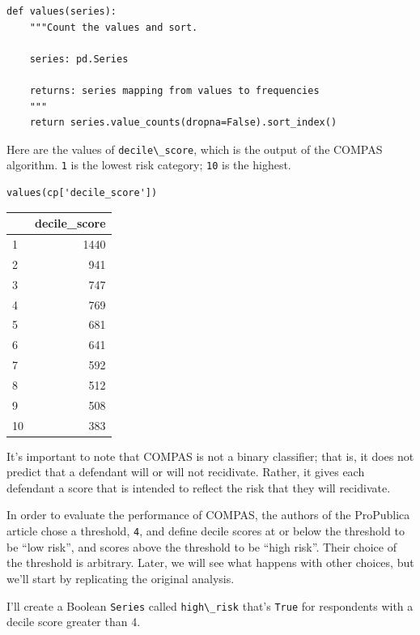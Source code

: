 \begin{lstlisting}[]
def values(series):
    """Count the values and sort.
    
    series: pd.Series
    
    returns: series mapping from values to frequencies
    """
    return series.value_counts(dropna=False).sort_index()
\end{lstlisting}

Here are the values of \passthrough{\lstinline!decile\_score!}, which is
the output of the COMPAS algorithm. \passthrough{\lstinline!1!} is the
lowest risk category; \passthrough{\lstinline!10!} is the highest.

\begin{lstlisting}[]
values(cp['decile_score'])
\end{lstlisting}

\begin{tabular}{lr}
\midrule
{} &  decile\_score \\
\midrule
1  &          1440 \\
2  &           941 \\
3  &           747 \\
4  &           769 \\
5  &           681 \\
6  &           641 \\
7  &           592 \\
8  &           512 \\
9  &           508 \\
10 &           383 \\
\midrule
\end{tabular}

It's important to note that COMPAS is not a binary classifier; that is,
it does not predict that a defendant will or will not recidivate.
Rather, it gives each defendant a score that is intended to reflect the
risk that they will recidivate.

In order to evaluate the performance of COMPAS, the authors of the
ProPublica article chose a threshold, \passthrough{\lstinline!4!}, and
define decile scores at or below the threshold to be ``low risk'', and
scores above the threshold to be ``high risk''. Their choice of the
threshold is arbitrary. Later, we will see what happens with other
choices, but we'll start by replicating the original analysis.

I'll create a Boolean \passthrough{\lstinline!Series!} called
\passthrough{\lstinline!high\_risk!} that's
\passthrough{\lstinline!True!} for respondents with a decile score
greater than 4.

